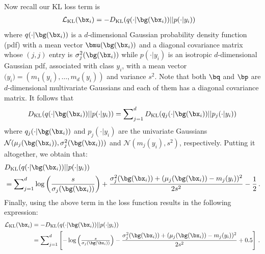\documentclass[accepted]{uai2022} %
\newcommand{\RED}[1]{{{\color{red}{#1}}}}
\newcommand{\BLUE}[1]{{{\color{blue}{#1}}}}
\newcommand{\REPLACE}[2]{\RED{REPLACE. } \BLUE{#1} \RED{WITH. } \BLUE{#2}}
\newcommand{\Lcal}{\mathcal{L}}
\newcommand{\Ncal}{\mathcal{N}}
\begin{document}
Now recall our KL loss term is
\begin{align}
    \Lcal_\mathrm{KL}(\bx_i) &= -D_{\mathrm{KL}}(q(\cdot|\bg(\bx_i))||p(\cdot|y_i))
\end{align}
where 
{$q(\cdot|\bg(\bx_i))$} is a $d$-dimensional Gaussian probability density function
(pdf) with a  mean vector $\bmu(\bg(\bx_i))$ and a diagonal covariance matrix
whose $(j,j)$ entry is $\sigma_j^2(\bg(\bx_i))$
while 
{$p(\cdot|y_i)$} is an isotropic $d$-dimensional Gaussian pdf, associated with class $y_i$, with a mean vector $\bm(y_i)=(m_1(y_i),\ldots,m_d(y_i))$ and variance $s^2$. 
Note that both $\bq$ and $\bp$ are $d$-dimensional multivariate Gaussians 
and each of them has a diagonal covariance matrix. It follows that
\begin{align}
    D_{\mathrm{KL}}(q(\cdot|\bg(\bx_i))||p(\cdot|y_i))=\sum\nolimits_{j=1}^d  D_{\mathrm{KL}}(q_j(\cdot|\bg(\bx_i))||p_j(\cdot|y_i))
\end{align}
where $q_j(\cdot|\bg(\bx_i))$ and $p_j(\cdot|y_i)$ are the univariate Gaussians $\Ncal(\mu_j(\bg(\bx_i)),\sigma_j^2(\bg(\bx_i)))$ and $\Ncal(m_j(y_i),s^2)$, respectively. 
Putting it altogether, we obtain that:
\begin{align}
&D_{\mathrm{KL}}(q(\cdot|\bg(\bx_i))||p(\cdot|y_i)) \\ \nonumber
&=\sum\nolimits_{j=1}^d \log\left(\frac{s}{\sigma_j(\bg(\bx_i))}\right) + \frac{\sigma_j^2(\bg(\bx_i)) + (\mu_j(\bg(\bx_i))-m_j(y_i))^2}{2s^2} - \frac{1}{2}\, .
\end{align}
Finally, using the above term in the loss function results in the following expression:
\begin{align}
    \Lcal_\mathrm{KL}(\bx_i) &= -D_{\mathrm{KL}}(q(\cdot|\bg(\bx_i))||p(\cdot|y_i)) \\ \nonumber
    &= \sum\nolimits_{j=1}^d \left[-\log\left(\tfrac{s}{\sigma_j(\bg(\bx_i))}\right)-\frac{\sigma_j^2(\bg(\bx_i))+(\mu_j(\bg(\bx_i))-m_j(y_i))^2}{2s^2}+0.5\right]\, .
\end{align}
\end{document}
